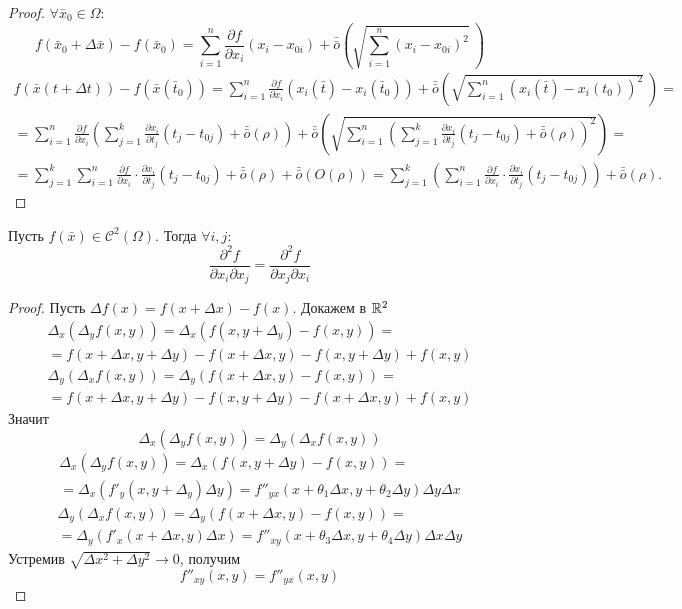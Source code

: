 \begin{proof}
    $\forall \bar{x}_0\in \Omega$:
    \[f(\bar{x}_0+\Delta \bar{x})-f(\bar{x}_0)=\sum\limits_{i=1}^{n}\frac{\partial {f}}{\partial {x_i}}(x_i-x_{0i})+\bar{\bar{o}}{\left(\sqrt{\sum\limits_{i=1}^{n}(x_i-x_{0i})^2}\ \right)}\]
    \begin{multline*}
        f(\bar{x}(t+\Delta t))-f(\bar{x}(\bar{t}_0))=\sum\limits_{i=1}^{n}\frac{\partial {f}}{\partial {x_i}}(x_i(\bar{t})-x_i(\bar{t}_0))+\bar{\bar{o}}{\left(\sqrt{\sum\limits_{i=1}^{n}(x_i(\bar{t})-x_i(t_0))^2}\ \right)}=\\
        =\sum\limits_{i=1}^{n}\frac{\partial {f}}{\partial {x_i}}\left(\sum\limits_{j=1}^{k}\frac{\partial {x_i}}{\partial {t_j}}(t_j-t_{0j})+\bar{\bar{o}}{(\rho)}\right)+\bar{\bar{o}}{\left(\sqrt{\sum\limits_{i=1}^{n}\left(\sum\limits_{j=1}^{k}\frac{\partial {x_i}}{\partial {t_j}}(t_j-t_{0j})+\bar{\bar{o}}{(\rho)}\right)^2}\right)}=\\
        =\sum\limits_{j=1}^{k}\sum\limits_{i=1}^{n}\frac{\partial {f}}{\partial {x_i}}\cdot \frac{\partial {x_i}}{\partial {t_j}}(t_j-t_{0j})+\bar{\bar{o}}{(\rho)}+\bar{\bar{o}}{(O(\rho))}=\sum\limits_{j=1}^{k}\left(\sum\limits_{i=1}^{n}\frac{\partial {f}}{\partial {x_i}}\cdot \frac{\partial {x_i}}{\partial {t_j}}(t_j-t_{0j})\right)+\bar{\bar{o}}{(\rho)}.
    \end{multline*}
\end{proof} 
\begin{theorem}
    Пусть $f(\bar{x})\in \mathcal{C}^2(\Omega)$. Тогда $\forall i,j:$
    \[\frac{\partial^2 {f}}{\partial {x_i}\partial{x_j}}=\frac{\partial^2 {f}}{\partial {x_j}\partial{x_i}}\]
\end{theorem} 
\begin{proof} 
    Пусть $\Delta f(x)=f(x+\Delta x)-f(x)$. Докажем в $\mathbb{R}^2$
    \begin{multline*}
        \Delta_x(\Delta_y f(x,y))=\Delta_x(f(x,y+\Delta_y)-f(x,y))=\\
        =f(x+\Delta x, y+\Delta y)-f(x+\Delta x, y)-f(x,y+\Delta y)+f(x,y)
    \end{multline*}
    \begin{multline*}
        \Delta_y(\Delta_x f(x,y))=\Delta_y(f(x+\Delta x,y)-f(x,y))=\\
        =f(x+\Delta x, y+\Delta y)-f(x,y+\Delta y)-f(x+\Delta x,y)+f(x,y)
    \end{multline*}
    Значит
    \[\Delta_x(\Delta_y f(x,y))=\Delta_y(\Delta_x f(x,y))\]
    \begin{multline*}
        \Delta_x(\Delta_y f(x,y))=\Delta_x (f(x,y+\Delta y)-f(x,y))=\\
        =\Delta_x(f'_y(x,y+\Delta_y)\Delta y)=f''_{yx}(x+\theta_1\Delta x,y+\theta_2\Delta y)\Delta y \Delta x
    \end{multline*}
    \begin{multline*}
        \Delta_y(\Delta_x f(x,y))=\Delta_y (f(x+\Delta x,y)-f(x,y))=\\
        =\Delta_y(f'_x(x+\Delta x,y)\Delta x)=f''_{xy}(x+\theta_3 \Delta x, y+\theta_4 \Delta y)\Delta x\Delta y
    \end{multline*}
    Устремив $\sqrt{\Delta x^2+\Delta y^2}\to 0$, получим
    \[f''_{xy}(x,y)=f''_{yx}(x,y)\]
\end{proof} 